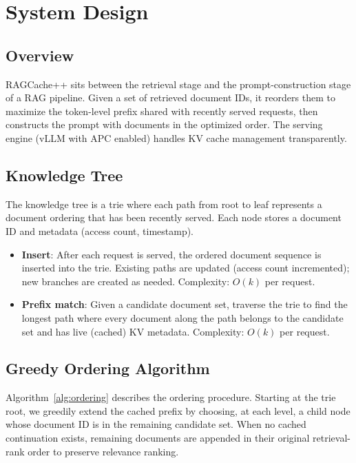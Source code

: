 \documentclass{article}
\begin{document}
\section{System Design}
\label{sec:design}

\subsection{Overview}

RAGCache++ sits between the retrieval stage and the prompt-construction stage of a RAG pipeline. Given a set of retrieved document IDs, it reorders them to maximize the token-level prefix shared with recently served requests, then constructs the prompt with documents in the optimized order. The serving engine (vLLM with APC enabled) handles KV cache management transparently.

\subsection{Knowledge Tree}

The knowledge tree is a trie where each path from root to leaf represents a document ordering that has been recently served. Each node stores a document ID and metadata (access count, timestamp).

\begin{itemize}
\item \textbf{Insert}: After each request is served, the ordered document sequence is inserted into the trie. Existing paths are updated (access count incremented); new branches are created as needed. Complexity: $O(k)$ per request.
\item \textbf{Prefix match}: Given a candidate document set, traverse the trie to find the longest path where every document along the path belongs to the candidate set and has live (cached) KV metadata. Complexity: $O(k)$ per request.
\end{itemize}

\subsection{Greedy Ordering Algorithm}

Algorithm~\ref{alg:ordering} describes the ordering procedure. Starting at the trie root, we greedily extend the cached prefix by choosing, at each level, a child node whose document ID is in the remaining candidate set. When no cached continuation exists, remaining documents are appended in their original retrieval-rank order to preserve relevance ranking.
\end{document}
